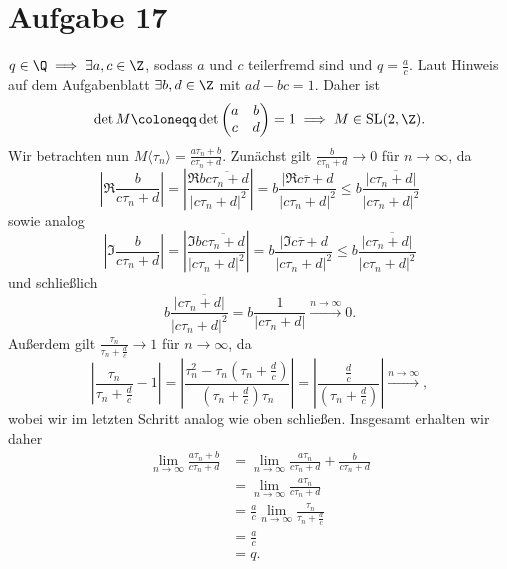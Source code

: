\documentclass{article}
\begin{document}
  \section*{Aufgabe 17}
  $q \in \Q \implies \exists a,c \in \Z$, sodass $a$ und $c$ teilerfremd sind und $q = \frac{a}{c}$.
  Laut Hinweis auf dem Aufgabenblatt $\exists b,d \in \Z$ mit $ad - bc = 1$. Daher ist 
  \[
    \det M \coloneqq \det 
    \begin{pmatrix}
    a & b\\ c & d
    \end{pmatrix} 
    = 1 \implies M \in \operatorname{SL}(2, \Z).
  \]
  Wir betrachten nun $M\langle \tau_n \rangle = \frac{a \tau_n + b}{c \tau_n + d}$.
  Zunächst gilt $\frac{b}{c \tau_n + d} \to 0$ für $n \to\infty$, da
  \begin{equation*}
    \left|\Re \frac{b}{c \tau_n + d}\right|=\left| \frac{\Re b\overline{c \tau_n + d}}{|c \tau_n + d|^2}\right| = b \frac{|\Re c \overline{\tau} + d}{|c \tau_n+ d|^2} \leq b \frac{|c \overline{\tau_n+ d|}}{|c \tau_n+ d|^2}
  \end{equation*}
  sowie analog
  \begin{equation*}
    \left|\Im \frac{b}{c \tau_n + d}\right|=\left| \frac{\Im b\overline{c \tau_n + d}}{|c \tau_n + d|^2}\right| = b \frac{|\Im c \overline{\tau} + d}{|c \tau_n+ d|^2} \leq b \frac{|c \overline{\tau_n+ d|}}{|c \tau_n+ d|^2}
  \end{equation*}
  und schließlich
  \begin{equation*}
    b \frac{|c \overline{\tau_n+ d|}}{|c \tau_n+ d|^2} = b \frac{1}{|c \tau_n +d|} \xrightarrow{n \to \infty} 0.
  \end{equation*}
  Außerdem gilt $\frac{\tau_n}{\tau_n + \frac{d}{c}} \to 1$ für $n\to \infty$, da
  \begin{equation*}
    \left| \frac{\tau_n}{\tau_n + \frac{d}{c}} - 1\right| = \left| \frac{\tau_n^2 - \tau_n (\tau_n + \frac{d}{c})}{(\tau_n + \frac{d}{c})\tau_n}\right| = \left| \frac{\frac{d}{c}}{(\tau_n + \frac{d}{c})}\right| \xrightarrow{n\to \infty},
  \end{equation*}
  wobei wir im letzten Schritt analog wie oben schließen.
  Insgesamt erhalten wir daher
  \begin{align*}
    \lim\limits_{n \to \infty} \frac{a \tau_n + b}{c \tau_n + d} &= \lim\limits_{n \to \infty} \frac{a \tau_n}{c \tau_n + d} + \frac{b}{c \tau_n + d}\\
    &= \lim\limits_{n \to \infty} \frac{a \tau_n}{c \tau_n + d}\\
    &= \frac{a}{c} \lim\limits_{n \to \infty} \frac{\tau_n}{\tau_n + \frac{d}{c}}\\
    &= \frac{a}{c}\\
    &= q.
  \end{align*}
\end{document}
